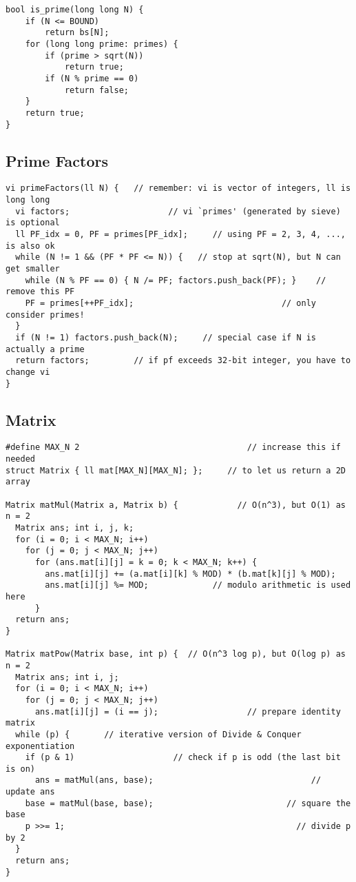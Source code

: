 \documentclass[10pt,landscape]{article}
\begin{document}
\begin{multicols}{2}
\begin{lstlisting}
bool is_prime(long long N) {
    if (N <= BOUND)
        return bs[N];
    for (long long prime: primes) {
        if (prime > sqrt(N))
            return true;
        if (N % prime == 0)
            return false;
    }
    return true;
}
\end{lstlisting}
\newpage

\subsection{Prime Factors}
\begin{lstlisting}
vi primeFactors(ll N) {   // remember: vi is vector of integers, ll is long long
  vi factors;                    // vi `primes' (generated by sieve) is optional
  ll PF_idx = 0, PF = primes[PF_idx];     // using PF = 2, 3, 4, ..., is also ok
  while (N != 1 && (PF * PF <= N)) {   // stop at sqrt(N), but N can get smaller
    while (N % PF == 0) { N /= PF; factors.push_back(PF); }    // remove this PF
    PF = primes[++PF_idx];                              // only consider primes!
  }
  if (N != 1) factors.push_back(N);     // special case if N is actually a prime
  return factors;         // if pf exceeds 32-bit integer, you have to change vi
}
\end{lstlisting}

\subsection{Matrix}
\begin{lstlisting}
#define MAX_N 2                                  // increase this if needed
struct Matrix { ll mat[MAX_N][MAX_N]; };     // to let us return a 2D array

Matrix matMul(Matrix a, Matrix b) {            // O(n^3), but O(1) as n = 2
  Matrix ans; int i, j, k;
  for (i = 0; i < MAX_N; i++)
    for (j = 0; j < MAX_N; j++)
      for (ans.mat[i][j] = k = 0; k < MAX_N; k++) {
        ans.mat[i][j] += (a.mat[i][k] % MOD) * (b.mat[k][j] % MOD);
        ans.mat[i][j] %= MOD;             // modulo arithmetic is used here
      }
  return ans;
}

Matrix matPow(Matrix base, int p) {  // O(n^3 log p), but O(log p) as n = 2
  Matrix ans; int i, j;
  for (i = 0; i < MAX_N; i++)
    for (j = 0; j < MAX_N; j++)
      ans.mat[i][j] = (i == j);                  // prepare identity matrix
  while (p) {       // iterative version of Divide & Conquer exponentiation
    if (p & 1)                    // check if p is odd (the last bit is on)
      ans = matMul(ans, base);                                // update ans
    base = matMul(base, base);                           // square the base
    p >>= 1;                                               // divide p by 2
  }
  return ans;
}
\end{lstlisting}


\end{multicols}
\end{document}
